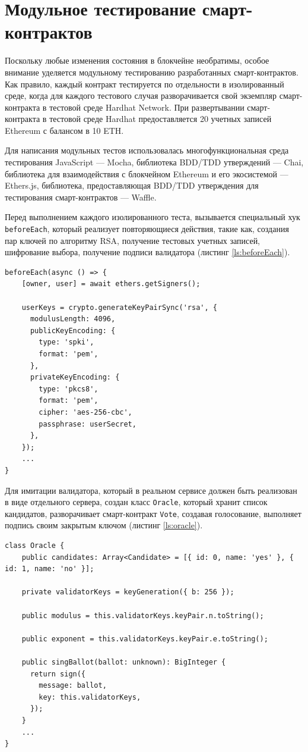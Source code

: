 \section{Модульное тестирование смарт-контрактов}

Поскольку любые изменения состояния в блокчейне необратимы, особое внимание уделяется модульному тестированию разработанных смарт-контрактов. Как правило, каждый контракт тестируется по отдельности в изолированный среде, когда для каждого тестового случая разворачивается свой экземпляр смарт-контракта в тестовой среде Hardhat Network.  При развертывании смарт-контракта в тестовой среде Hardhat предоставляется 20 учетных записей Ethereum с балансом в 10 ETH.

Для написания модульных тестов использовалась многофункциональная среда тестирования JavaScript — Mocha, библиотека BDD/TDD утверждений — Chai, библиотека для взаимодействия с блокчейном Ethereum и его экосистемой — Ethers.js, библиотека, предоставляющая BDD/TDD утверждения для тестирования смарт-контрактов — Waffle.

Перед выполнением каждого изолированного теста, вызывается специальный хук \verb|beforeEach|, который реализует повторяющиеся действия, такие как, создания пар ключей по алгоритму RSA, получение тестовых учетных записей, шифрование выбора, получение подписи валидатора (листинг \ref{ls:beforeEach}).

\begin{lstlisting}[caption={Часть реализации хука beforeEach}, label={ls:beforeEach}]
beforeEach(async () => {
    [owner, user] = await ethers.getSigners();

    userKeys = crypto.generateKeyPairSync('rsa', {
      modulusLength: 4096,
      publicKeyEncoding: {
        type: 'spki',
        format: 'pem',
      },
      privateKeyEncoding: {
        type: 'pkcs8',
        format: 'pem',
        cipher: 'aes-256-cbc',
        passphrase: userSecret,
      },
    });
    ...
}
\end{lstlisting}

Для имитации валидатора, который в реальном сервисе должен быть реализован в виде отдельного сервера, создан класс \verb|Oracle|, который хранит список кандидатов, разворачивает смарт-контракт \verb|Vote|, создавая голосование, выполняет подпись своим закрытым ключом (листинг \ref{ls:oracle}).

\begin{lstlisting}[caption={Часть класса реализующего функционал валидатора}, label={ls:oracle}]
class Oracle {
    public candidates: Array<Candidate> = [{ id: 0, name: 'yes' }, { id: 1, name: 'no' }];
  
    private validatorKeys = keyGeneration({ b: 256 });
  
    public modulus = this.validatorKeys.keyPair.n.toString();
  
    public exponent = this.validatorKeys.keyPair.e.toString();
  
    public singBallot(ballot: unknown): BigInteger {
      return sign({
        message: ballot,
        key: this.validatorKeys,
      });
    }
    ...
}
\end{lstlisting}

